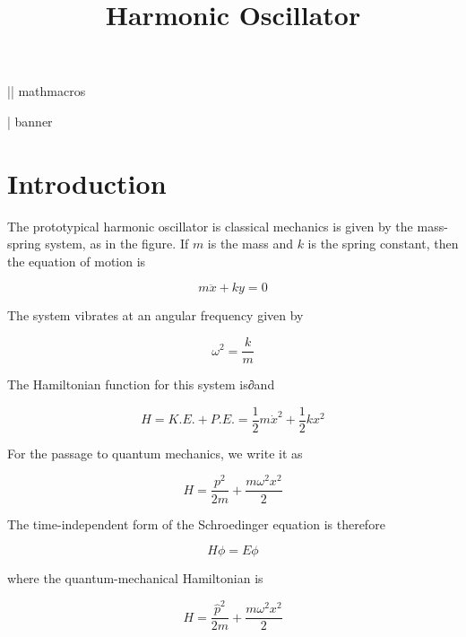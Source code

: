 \title{Harmonic Oscillator}

|| mathmacros
\newcommand{\bra}[0]{\langle}
\newcommand{\ket}[0]{\rangle}
\newcommand{\set}[1]{\{#1\}}

| banner


\setcounter{6}


\contents


\section{Introduction}





The prototypical harmonic oscillator is classical mechanics is given by the mass-spring system, as in the figure.  If $m$ is the mass and $k$ is the spring constant, then the equation of motion is

\begin{equation}
m\ddot x + ky = 0
\end{equation}

The system vibrates at an angular frequency given by

\begin{equation}
\omega^2 = \frac{k}{m}
\end{equation}

The Hamiltonian function for this system is∂and

\begin{equation}
  H = K.E. + P.E. = \frac{1}{2}m\dot x^2 + \frac{1}{2}kx^2
\end{equation}

For the passage to quantum mechanics, we write it as

\begin{equation}
  H =  \frac{p^2}{2m} + \frac{m\omega^2 x^2  }{2}
\end{equation}

The time-independent form of the Schroedinger equation is therefore

\begin{equation}
H\phi =E\phi
\end{equation}

where the quantum-mechanical Hamiltonian is

\begin{equation}
  H =  \frac{\hat p^2}{2m} + \frac{m\omega^2 x^2  }{2}
\end{equation}

